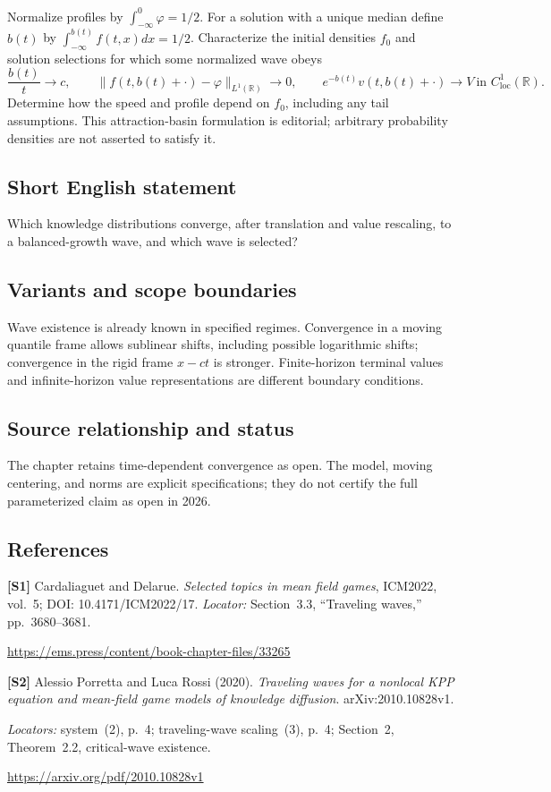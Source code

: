 \documentclass[11pt,a4paper]{article}
\begin{document}
Normalize profiles by $\int_{-\infty}^0\varphi=1/2$. For a solution with a unique median define $b(t)$ by $\int_{-\infty}^{b(t)}f(t,x)dx=1/2$. Characterize the initial densities $f_0$ and solution selections for which some normalized wave obeys
\[
 \frac{b(t)}t\longrightarrow c,\qquad
 \|f(t,b(t)+\cdot)-\varphi\|_{L^1(\mathbb R)}\longrightarrow0,\qquad
 e^{-b(t)}v(t,b(t)+\cdot)\longrightarrow V
 \ \text{in }C^1_{\mathrm{loc}}(\mathbb R).
\]
Determine how the speed and profile depend on $f_0$, including any tail assumptions. This attraction-basin formulation is editorial; arbitrary probability densities are not asserted to satisfy it.
\subsection*{Short English statement}
Which knowledge distributions converge, after translation and value rescaling, to a balanced-growth wave, and which wave is selected?
\subsection*{Variants and scope boundaries}
Wave existence is already known in specified regimes. Convergence in a moving quantile frame allows sublinear shifts, including possible logarithmic shifts; convergence in the rigid frame $x-ct$ is stronger. Finite-horizon terminal values and infinite-horizon value representations are different boundary conditions.
\subsection*{Source relationship and status}
The chapter retains time-dependent convergence as open. The model, moving centering, and norms are explicit specifications; they do not certify the full parameterized claim as open in 2026.
\subsection*{References}
\begingroup\footnotesize\raggedright
{\footnotesize\raggedright
\textbf{[S1]} Cardaliaguet and Delarue. \emph{Selected topics in mean field games}, ICM2022, vol.~5; DOI: 10.4171/ICM2022/17. \textit{Locator:} Section~3.3, ``Traveling waves,'' pp.~3680--3681.\par
\url{https://ems.press/content/book-chapter-files/33265}\par\smallskip
\textbf{[S2]} Alessio Porretta and Luca Rossi (2020). \emph{Traveling waves for a nonlocal KPP equation and mean-field game models of knowledge diffusion}. arXiv:2010.10828v1.\par
\textit{Locators:} system~(2), p.~4; traveling-wave scaling~(3), p.~4; Section~2, Theorem~2.2, critical-wave existence.\par
\url{https://arxiv.org/pdf/2010.10828v1}\par}
\par\endgroup
\end{document}
